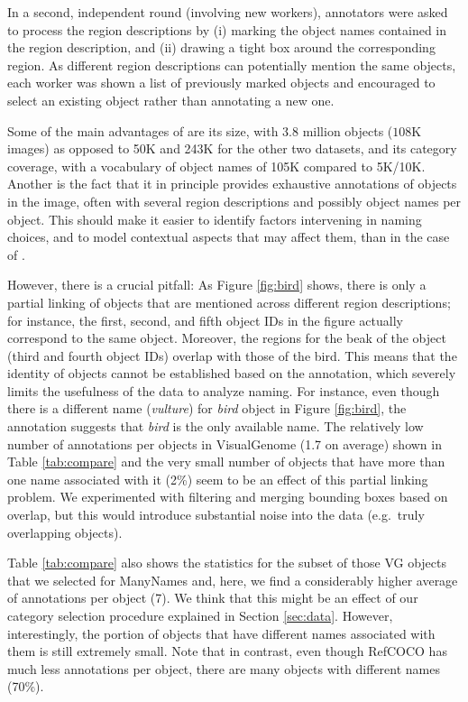 In a second, independent round (involving new workers), annotators were asked to process the region descriptions by (i) marking the object names contained in the region description, and (ii) drawing a tight box around the corresponding region. As different region descriptions can potentially mention the same objects, each worker was shown a list of previously marked objects and encouraged to select an existing object rather than annotating a new one.


Some of the main advantages of \vg are its size, with 3.8 million objects ($108$K images) as opposed to 50K and 243K for the other two datasets, and its category coverage, with a vocabulary of object names of 105K compared to 5K/10K.
Another is the fact that it in principle provides exhaustive annotations of objects in the image, often with several region descriptions and possibly object names per object.
This should make it easier to identify factors intervening in naming choices, and to model contextual aspects that may affect them, than in the case of .

However, there is a crucial pitfall: As Figure \ref{fig:bird} shows, there is only a partial linking of objects that are mentioned across different region descriptions; for instance, the first, second, and fifth object IDs in the figure actually correspond to the same object.
Moreover, the regions for the beak of the object (third and fourth object IDs) overlap with those of the bird.
This means that the identity of objects cannot be established based on the annotation, which severely limits the usefulness of the data to analyze naming.
For instance, even though there is a different name (\textit{vulture}) for \textit{bird} object in Figure \ref{fig:bird}, the annotation suggests that \textit{bird} is the only available name. 
The relatively low number of annotations per objects in VisualGenome (1.7 on average) shown in Table \ref{tab:compare} and the very small number of objects that have more than one name associated with it (2\%) seem to be an effect of this partial linking problem.
We experimented with filtering and merging bounding boxes based on overlap, but this would introduce substantial noise into the data (e.g.\ truly overlapping objects).

Table \ref{tab:compare} also shows the statistics for the subset of those VG objects that we selected for ManyNames and, here, we find a considerably higher average of annotations per object (7). 
We think that this might be an effect of our category selection procedure explained in Section \ref{sec:data}. However, interestingly, the portion of objects that have different names associated with them is still extremely small.
Note that in contrast, even though RefCOCO has much less annotations per object, there are many objects with different names (70\%).



